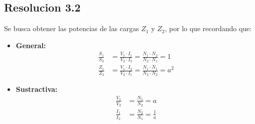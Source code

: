 \documentclass[
  11pt,
  letterpaper,
   addpoints,
   answers
  ]{exam}
\begin{document}
\begin{questions}
\begin{solution}
    \subsection*{Resolucion 3.2}
    Se busca obtener las potencias de las cargas $Z_{1}$ y $Z_{2}$, por lo que recordando que:
    
\begin{itemize}
    \item \textbf{General:}
    \begin{align}
    \frac{S_1}{S_2} &= \frac{V_1 \cdot I_1}{V_2 \cdot I_2} = \frac{N_1 \cdot N_2}{N_2 \cdot N_1} = 1 \\
    \frac{Z_1}{Z_2} &= \frac{V_1 \cdot I_2}{V_2 \cdot I_1} = \frac{N_1 \cdot N_1}{N_2 \cdot N_2} = a^2
    \end{align}

    \item \textbf{Sustractiva:}
    \begin{align}
    \frac{V_1}{V_2} &= \frac{N_1}{N_2} = a \\
    \frac{I_1}{I_2} &= \frac{N_2}{N_1} = \frac{1}{a}
    \end{align}


\end{itemize}
\end{solution}
\end{questions}
\end{document}
